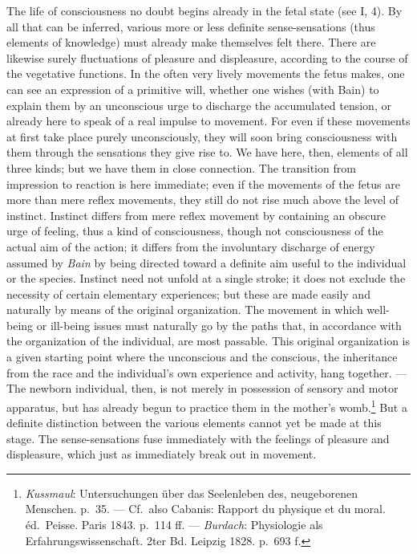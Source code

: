 \documentclass[12pt,a4paper]{book}
\newcommand{\opage}[1]{\marginnote{\footnotesize\textit{[#1]}}}
\begin{document}
The life of consciousness no doubt begins already in the fetal state (see
I, 4). By all that can be inferred, various more or less definite
sense-sensations (thus elements of knowledge) must already make
themselves felt there. There are likewise surely fluctuations of pleasure
and displeasure, according to the course of the vegetative functions. In
the often very lively movements
\opage{108}the fetus makes, one can see an expression of a primitive will,
whether one wishes (with Bain) to explain them by an unconscious urge to
discharge the accumulated tension, or already here to speak of a real
impulse to movement. For even if these movements at first take place
purely unconsciously, they will soon bring consciousness with them through
the sensations they give rise to. We have here, then, elements of all
three kinds; but we have them in close connection. The transition from
impression to reaction is here immediate; even if the movements of the
fetus are more than mere reflex movements, they still do not rise much
above the level of instinct. Instinct differs from mere reflex movement by
containing an obscure urge of feeling, thus a kind of consciousness,
though not consciousness of the actual aim of the action; it differs from
the involuntary discharge of energy assumed by \emph{Bain} by being
directed toward a definite aim useful to the individual or the species.
Instinct need not unfold at a single stroke; it does not exclude the
necessity of certain elementary experiences; but these are made easily
and naturally by means of the original organization. The movement in
which well-being or ill-being issues must naturally go by the paths that,
in accordance with the organization of the individual, are most passable.
This original organization is a given starting point where the
unconscious and the conscious, the inheritance from the race and the
individual's own experience and activity, hang together. --- The newborn
individual, then, is not merely in possession of sensory and motor
apparatus, but has already begun to practice them in the mother's
womb.\footnote{\emph{Kussmaul}: Untersuchungen über das Seelenleben des,
neugeborenen Menschen. p.~35. --- Cf.\ also Cabanis: Rapport du physique
et du moral. éd.\ Peisse. Paris 1843. p.~114 ff. --- \emph{Burdach}:
Physiologie als Erfahrungswissenschaft. 2ter Bd. Leipzig 1828. p.~693 f.}
But a definite distinction between the various elements cannot yet be
made at this stage. The sense-sensations fuse immediately with the
feelings of pleasure and displeasure, which just as immediately break out
in movement.
\end{document}
